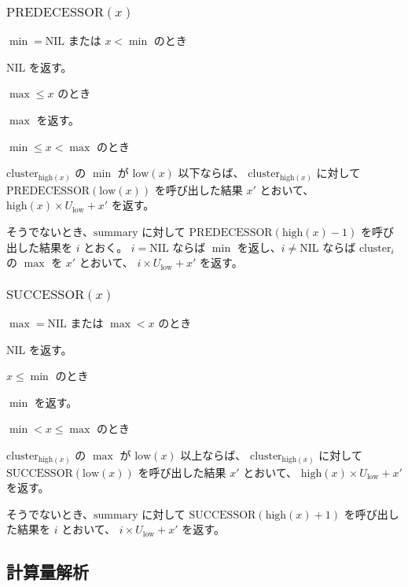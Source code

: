 \documentclass[dvipdfmx,a4j,10pt]{jarticle}
\begin{document}
\subsubsection{$\mathrm{PREDECESSOR}(x)$}

\noindent [1] $\min = \mathrm{NIL}$ または $x < \min$ のとき

$\mathrm{NIL}$ を返す。

\noindent [2] $\max \leq x$ のとき

$\max$ を返す。

\noindent [3] $\min \leq x < \max$ のとき

$\mathrm{cluster}_{\mathrm{high}(x)}$ の $\min$ が $\mathrm{low}(x)$ 以下ならば、
$\mathrm{cluster}_{\mathrm{high}(x)}$ に対して $\mathrm{PREDECESSOR}(\mathrm{low}(x))$ を呼び出した結果 $x'$ とおいて、
$\mathrm{high}(x) \times U_{\mathrm{low}} + x'$ を返す。

そうでないとき、$\mathrm{summary}$ に対して $\mathrm{PREDECESSOR}(\mathrm{high}(x) - 1)$ を呼び出した結果を $i$ とおく。
$i = \mathrm{NIL}$ ならば $\min$ を返し、$i \neq \mathrm{NIL}$ ならば $\mathrm{cluster}_i$ の $\max$ を $x'$ とおいて、
$i \times U_{\mathrm{low}} + x'$ を返す。

\subsubsection{$\mathrm{SUCCESSOR}(x)$}

\noindent [1] $\max = \mathrm{NIL}$ または $\max < x$ のとき

$\mathrm{NIL}$ を返す。

\noindent [2] $x \leq \min$ のとき

$\min$ を返す。

\noindent [3] $\min < x \leq \max$ のとき

$\mathrm{cluster}_{\mathrm{high}(x)}$ の $\max$ が $\mathrm{low}(x)$ 以上ならば、
$\mathrm{cluster}_{\mathrm{high}(x)}$ に対して $\mathrm{SUCCESSOR}(\mathrm{low}(x))$ を呼び出した結果 $x'$ とおいて、
$\mathrm{high}(x) \times U_{\mathrm{low}} + x'$ を返す。

そうでないとき、$\mathrm{summary}$ に対して $\mathrm{SUCCESSOR}(\mathrm{high}(x) + 1)$ を呼び出した結果を $i$ とおいて、
$i \times U_{\mathrm{low}} + x'$ を返す。

\subsection{計算量解析}
\end{document}
